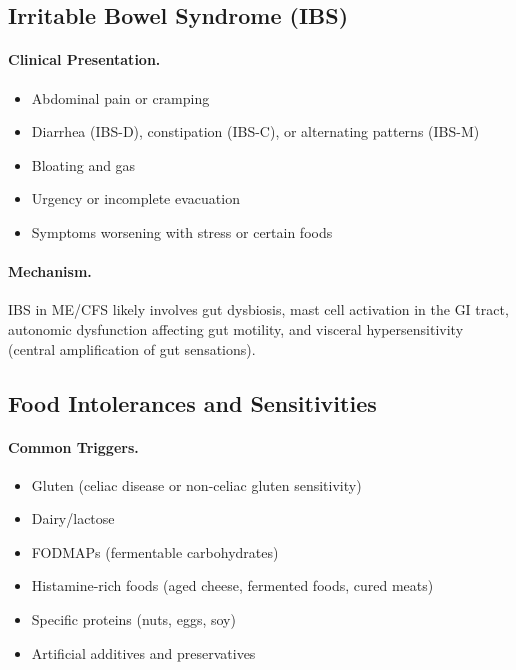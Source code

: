 \subsection{Irritable Bowel Syndrome (IBS)}
\label{subsec:ibs}

\paragraph{Clinical Presentation.}
\begin{itemize}
    \item Abdominal pain or cramping
    \item Diarrhea (IBS-D), constipation (IBS-C), or alternating patterns (IBS-M)
    \item Bloating and gas
    \item Urgency or incomplete evacuation
    \item Symptoms worsening with stress or certain foods
\end{itemize}

\paragraph{Mechanism.}
IBS in ME/CFS likely involves gut dysbiosis, mast cell activation in the GI tract, autonomic dysfunction affecting gut motility, and visceral hypersensitivity (central amplification of gut sensations).

\subsection{Food Intolerances and Sensitivities}
\label{subsec:food-intolerances}

\paragraph{Common Triggers.}
\begin{itemize}
    \item Gluten (celiac disease or non-celiac gluten sensitivity)
    \item Dairy/lactose
    \item FODMAPs (fermentable carbohydrates)
    \item Histamine-rich foods (aged cheese, fermented foods, cured meats)
    \item Specific proteins (nuts, eggs, soy)
    \item Artificial additives and preservatives
\end{itemize}

